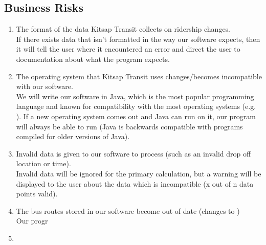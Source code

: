 \subsection{Business Risks}
\begin{enumerate}
	\item The format of the data Kitsap Transit collects on ridership changes. \\
	If there exists data that isn't formatted in the way our software expects, then it will tell the user where it encountered an error and direct the user to documentation about what the program expects.
	 
	\item The operating system that Kitsap Transit uses changes/becomes incompatible with our software. \\
	We will write our software in Java, which is the most popular programming language and known for compatibility with the most operating systems (e.g. ). If a new operating system comes out and Java can run on it, our program will always be able to run (Java is backwards compatible with programs compiled for older versions of Java).

	\item Invalid data is given to our software to process (such as an invalid drop off location or time). \\
	Invalid data will be ignored for the primary calculation, but a warning will be displayed to the user about the data which is incompatible (x out of n data points valid).


	\item The bus routes stored in our software become out of date (changes to )\\
	Our progr
	\item 

\end{enumerate}
\raggedbottom
